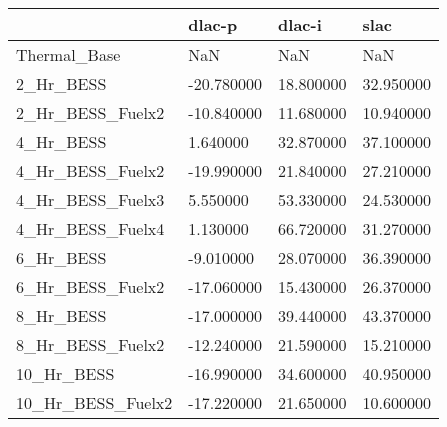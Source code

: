 \begin{tabular}{llll}
\toprule
 & dlac-p & dlac-i & slac \\
\midrule
Thermal_Base & NaN & NaN & NaN \\
2_Hr_BESS & -20.780000 & 18.800000 & 32.950000 \\
2_Hr_BESS_Fuelx2 & -10.840000 & 11.680000 & 10.940000 \\
4_Hr_BESS & 1.640000 & 32.870000 & 37.100000 \\
4_Hr_BESS_Fuelx2 & -19.990000 & 21.840000 & 27.210000 \\
4_Hr_BESS_Fuelx3 & 5.550000 & 53.330000 & 24.530000 \\
4_Hr_BESS_Fuelx4 & 1.130000 & 66.720000 & 31.270000 \\
6_Hr_BESS & -9.010000 & 28.070000 & 36.390000 \\
6_Hr_BESS_Fuelx2 & -17.060000 & 15.430000 & 26.370000 \\
8_Hr_BESS & -17.000000 & 39.440000 & 43.370000 \\
8_Hr_BESS_Fuelx2 & -12.240000 & 21.590000 & 15.210000 \\
10_Hr_BESS & -16.990000 & 34.600000 & 40.950000 \\
10_Hr_BESS_Fuelx2 & -17.220000 & 21.650000 & 10.600000 \\
\bottomrule
\end{tabular}
